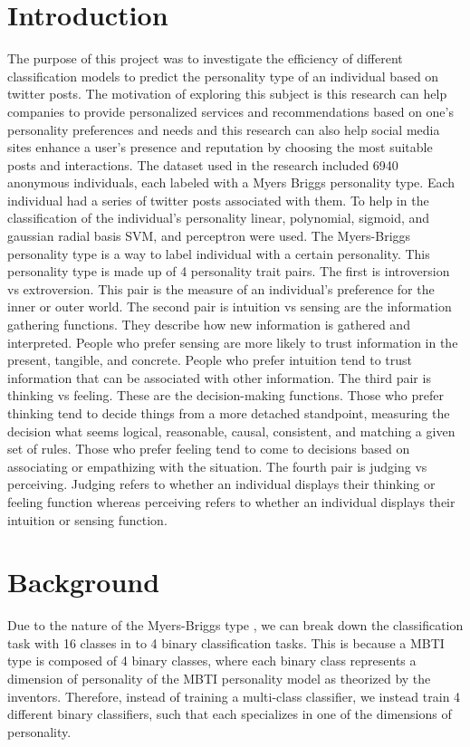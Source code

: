 \documentclass{article}
\begin{document}
\section{Introduction}
The purpose of this project was to investigate the efficiency of different classification models to predict the personality type of an individual based on twitter posts. The motivation of exploring this subject is this research can help companies to provide personalized services and recommendations based on one’s personality preferences and needs and this research can also help social media sites enhance a user’s presence and reputation by choosing the most suitable posts and interactions. The dataset used in the research included 6940 anonymous individuals, each labeled with a Myers Briggs personality type. Each individual had a series of twitter posts associated with them. To help in the classification of the individual’s personality linear, polynomial, sigmoid, and gaussian radial basis SVM, and perceptron were used.
The Myers-Briggs personality type is a way to label individual with a certain personality. This personality type is made up of 4 personality trait pairs. The first is introversion vs extroversion. This pair is the measure of an individual’s preference for the inner or outer world.
 	The second pair is intuition vs sensing are the information gathering functions. They describe how new information is gathered and interpreted. People who prefer sensing are more likely to trust information in the present, tangible, and concrete. People who prefer intuition tend to trust information that can be associated with other information.	
	The third pair is thinking vs feeling. These are the decision-making functions. Those who prefer thinking tend to decide things from a more detached standpoint, measuring the decision what seems logical, reasonable, causal, consistent, and matching a given set of rules. Those who prefer feeling tend to come to decisions based on associating or empathizing with the situation.
	The fourth pair is judging vs perceiving. Judging refers to whether an individual displays their thinking or feeling function whereas perceiving refers to whether an individual displays their intuition or sensing function. 

\section{Background}

Due to the nature of the Myers-Briggs type , we can break down the classification task with 16 classes in to 4 binary classification tasks. This is because a MBTI type is composed of 4 binary classes, where each binary class represents a dimension of personality of the MBTI personality model as theorized by the inventors. Therefore, instead of training a multi-class classifier, we instead train 4 different binary classifiers, such that each specializes in one of the dimensions of personality. 
\end{document}
